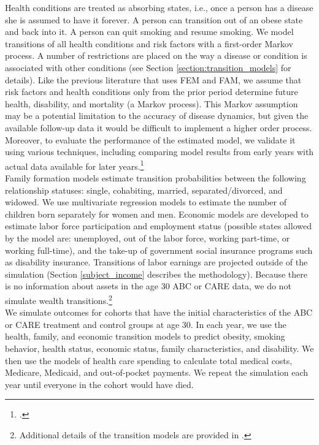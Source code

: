 \noindent Health conditions are treated as absorbing states, i.e., once a person has a disease she is assumed to have it forever. A person can transition out of an obese state and back into it. A person can quit smoking and resume smoking. We model transitions of all health conditions and risk factors with a first-order Markov process. A number of restrictions are placed on the way a disease or condition is associated with other conditions (see Section \ref{section:transition_models} for details). Like the previous literature that uses FEM and FAM, we assume that risk factors and health conditions only from the prior period determine future health, disability, and mortality (a Markov process). This Markov assumption may be a potential limitation to the accuracy of disease dynamics, but given the available follow-up data it would be difficult to implement a higher order process. Moreover, to evaluate the performance of the estimated model, we validate it using various techniques, including comparing model results from early years with actual data available for later years.\footnote{\citet{Goldman_etal_2015_Future-America-Model}.} \\

\noindent Family formation models estimate transition probabilities between the following relationship statuses:  single, cohabiting, married, separated/divorced, and widowed. We use multivariate regression models to estimate the number of children born separately for women and men. Economic models are developed to estimate labor force participation and employment status (possible states allowed by the model are: unemployed, out of the labor force, working part-time, or working full-time), and the take-up of government social insurance programs such as disability insurance. 
Transitions of labor earnings are projected outside of the simulation (Section \ref{subject_income} describes the methodology).  Because there is no information about assets in the age 30 ABC or CARE data, we do not simulate wealth transitions.\footnote{Additional details of the transition models are provided in \citet{Goldman_etal_2015_Future-America-Model}.} \\

\noindent We simulate outcomes for cohorts that have the initial characteristics of the ABC or CARE treatment and control groups at age 30. In each year, we use the health, family, and economic transition models to predict obesity, smoking behavior, health status, economic status, family characteristics, and disability. We then use the models of health care spending to calculate total medical costs, Medicare, Medicaid, and out-of-pocket payments. We repeat the simulation each year until everyone in the cohort would have died. \\
